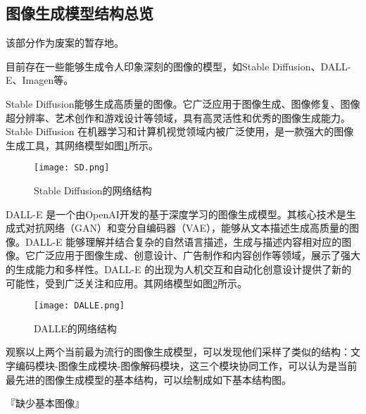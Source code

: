 \subsection{图像生成模型结构总览}

该部分作为废案的暂存地。

目前存在一些能够生成令人印象深刻的图像的模型，如Stable Diffusion\cite{rombachHighResolutionImageSynthesis2022a}、DALL-E\cite{rameshHierarchicalTextConditionalImage2022}、Imagen\cite{saharia2022photorealistic}等。

Stable Diffusion\cite{rombachHighResolutionImageSynthesis2022a}能够生成高质量的图像。它广泛应用于图像生成、图像修复、图像超分辨率、艺术创作和游戏设计等领域，具有高灵活性和优秀的图像生成能力。Stable Diffusion 在机器学习和计算机视觉领域内被广泛使用，是一款强大的图像生成工具，其网络模型如图\ref{img_stable}所示。

\begin{figure}[htbp]
    \centering
    \texttt{[image: SD.png]}
    \caption{Stable Diffusion的网络结构\cite{rombachHighResolutionImageSynthesis2022a}}
    \label{img_stable}
\end{figure}

DALL-E\cite{rameshHierarchicalTextConditionalImage2022} 是一个由OpenAI开发的基于深度学习的图像生成模型。其核心技术是生成式对抗网络（GAN）和变分自编码器（VAE），能够从文本描述生成高质量的图像。DALL-E 能够理解并结合复杂的自然语言描述，生成与描述内容相对应的图像。它广泛应用于图像生成、创意设计、广告制作和内容创作等领域，展示了强大的生成能力和多样性。DALL-E 的出现为人机交互和自动化创意设计提供了新的可能性，受到广泛关注和应用。其网络模型如图\ref{img_dalle}所示。

\begin{figure}[htbp]
    \centering
    \texttt{[image: DALLE.png]}
    \caption{DALLE的网络结构\cite{rameshHierarchicalTextConditionalImage2022}}
    \label{img_dalle}
\end{figure}

观察以上两个当前最为流行的图像生成模型，可以发现他们采样了类似的结构：文字编码模块-图像生成模块-图像解码模块，这三个模块协同工作，可以认为是当前最先进的图像生成模型的基本结构，可以绘制成如下基本结构图。

『缺少基本图像』

